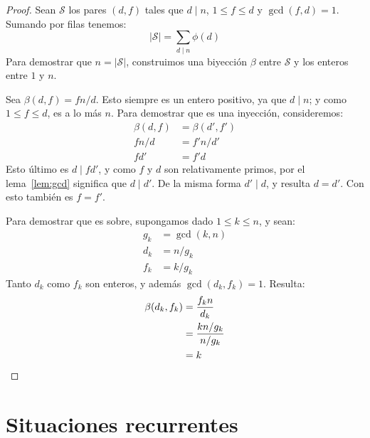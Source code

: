   \begin{proof}
    Sean \(\mathcal{S}\) los pares \((d, f)\)
    tales que \(d \mid n\), \(1 \le f \le d\) y \(\gcd(f, d) = 1\).
    Sumando por filas tenemos:
    \begin{equation*}
      \lvert \mathcal{S} \rvert
	= \sum_{d \mid n} \phi(d)
    \end{equation*}
    Para demostrar que \(n = \lvert \mathcal{S} \rvert\),
    construimos una biyección \(\beta\)
    entre \(\mathcal{S}\) y los enteros entre \(1\) y \(n\).

    Sea \(\beta(d, f) =	 f n / d\).
    Esto siempre es un entero positivo,
    ya que \(d \mid n\);
    y como \(1 \le f \le d\),
    es a lo más \(n\).
    Para demostrar que es una inyección,
    consideremos:
    \begin{align*}
      \beta(d, f)
	&= \beta(d', f') \\
      f n / d
	&= f' n / d' \\
      f d'
	&= f' d
    \end{align*}
    Esto último es \(d \mid f d'\),
    y como \(f\) y \(d\) son relativamente primos,
    por el lema~\ref{lem:gcd}
    significa que \(d \mid d'\).
    De la misma forma \(d' \mid d\),
    y resulta \(d = d'\).
    Con esto también es \(f = f'\).

    Para demostrar que es sobre,
    supongamos dado \(1 \le k \le n\),
    y sean:
    \begin{align*}
      g_k
	&= \gcd(k, n) \\
      d_k
	&= n / g_k    \\
      f_k
	&= k / g_k
    \end{align*}
    Tanto \(d_k\) como \(f_k\) son enteros,
    y además \(\gcd(d_k, f_k) = 1\).
    Resulta:
    \begin{align*}
      \beta(d_k, f_k)
	&= \frac{f_k n}{d_k} \\
	&= \frac{k n / g_k}{n / g_k} \\
	&= k
	   \qedhere
    \end{align*}
  \end{proof}

\section{Situaciones recurrentes}
\label{sec:conteos-recurrentes}

